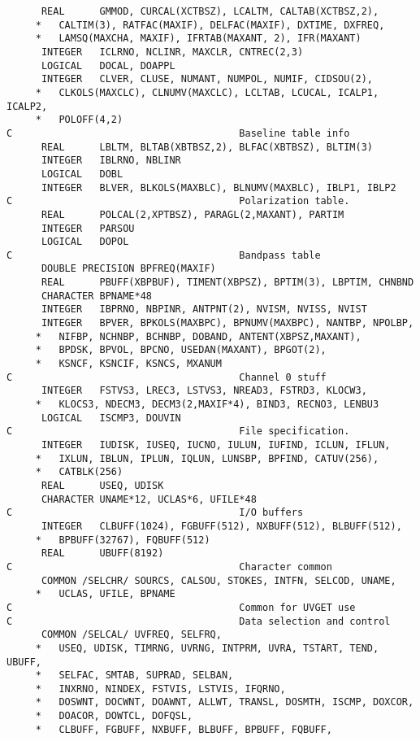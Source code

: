 \begin{verbatim}
      REAL      GMMOD, CURCAL(XCTBSZ), LCALTM, CALTAB(XCTBSZ,2),
     *   CALTIM(3), RATFAC(MAXIF), DELFAC(MAXIF), DXTIME, DXFREQ,
     *   LAMSQ(MAXCHA, MAXIF), IFRTAB(MAXANT, 2), IFR(MAXANT)
      INTEGER   ICLRNO, NCLINR, MAXCLR, CNTREC(2,3)
      LOGICAL   DOCAL, DOAPPL
      INTEGER   CLVER, CLUSE, NUMANT, NUMPOL, NUMIF, CIDSOU(2),
     *   CLKOLS(MAXCLC), CLNUMV(MAXCLC), LCLTAB, LCUCAL, ICALP1, ICALP2,
     *   POLOFF(4,2)
C                                       Baseline table info
      REAL      LBLTM, BLTAB(XBTBSZ,2), BLFAC(XBTBSZ), BLTIM(3)
      INTEGER   IBLRNO, NBLINR
      LOGICAL   DOBL
      INTEGER   BLVER, BLKOLS(MAXBLC), BLNUMV(MAXBLC), IBLP1, IBLP2
C                                       Polarization table.
      REAL      POLCAL(2,XPTBSZ), PARAGL(2,MAXANT), PARTIM
      INTEGER   PARSOU
      LOGICAL   DOPOL
C                                       Bandpass table
      DOUBLE PRECISION BPFREQ(MAXIF)
      REAL      PBUFF(XBPBUF), TIMENT(XBPSZ), BPTIM(3), LBPTIM, CHNBND
      CHARACTER BPNAME*48
      INTEGER   IBPRNO, NBPINR, ANTPNT(2), NVISM, NVISS, NVIST
      INTEGER   BPVER, BPKOLS(MAXBPC), BPNUMV(MAXBPC), NANTBP, NPOLBP,
     *   NIFBP, NCHNBP, BCHNBP, DOBAND, ANTENT(XBPSZ,MAXANT),
     *   BPDSK, BPVOL, BPCNO, USEDAN(MAXANT), BPGOT(2),
     *   KSNCF, KSNCIF, KSNCS, MXANUM
C                                       Channel 0 stuff
      INTEGER   FSTVS3, LREC3, LSTVS3, NREAD3, FSTRD3, KLOCW3,
     *   KLOCS3, NDECM3, DECM3(2,MAXIF*4), BIND3, RECNO3, LENBU3
      LOGICAL   ISCMP3, DOUVIN
C                                       File specification.
      INTEGER   IUDISK, IUSEQ, IUCNO, IULUN, IUFIND, ICLUN, IFLUN,
     *   IXLUN, IBLUN, IPLUN, IQLUN, LUNSBP, BPFIND, CATUV(256),
     *   CATBLK(256)
      REAL      USEQ, UDISK
      CHARACTER UNAME*12, UCLAS*6, UFILE*48
C                                       I/O buffers
      INTEGER   CLBUFF(1024), FGBUFF(512), NXBUFF(512), BLBUFF(512),
     *   BPBUFF(32767), FQBUFF(512)
      REAL      UBUFF(8192)
C                                       Character common
      COMMON /SELCHR/ SOURCS, CALSOU, STOKES, INTFN, SELCOD, UNAME,
     *   UCLAS, UFILE, BPNAME
C                                       Common for UVGET use
C                                       Data selection and control
      COMMON /SELCAL/ UVFREQ, SELFRQ,
     *   USEQ, UDISK, TIMRNG, UVRNG, INTPRM, UVRA, TSTART, TEND, UBUFF,
     *   SELFAC, SMTAB, SUPRAD, SELBAN,
     *   INXRNO, NINDEX, FSTVIS, LSTVIS, IFQRNO,
     *   DOSWNT, DOCWNT, DOAWNT, ALLWT, TRANSL, DOSMTH, ISCMP, DOXCOR,
     *   DOACOR, DOWTCL, DOFQSL,
     *   CLBUFF, FGBUFF, NXBUFF, BLBUFF, BPBUFF, FQBUFF,

\end{verbatim}
